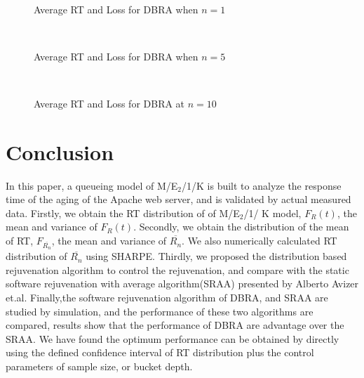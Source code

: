 \documentclass[10pt,journal,letterpaper,compsoc]{IEEEtran}
\begin{document}
\begin{figure}[htb]
\centering
{}
\\
\caption{Average RT and Loss for DBRA  when $n=1$}
\end{figure}

\begin{figure}[htb]
\centering
{}
\\
\caption{Average RT and Loss for DBRA when  $n=5$}
\end{figure}

\begin{figure}[htb]
\centering
{}
\\
\caption{Average RT and Loss for DBRA at $n=10$}
\end{figure}

\section{Conclusion}
\label{sec:conclusion}
In this paper, a queueing model of M/E$_2$/1/K is built to analyze the
response time of the aging of the Apache web server,
and is validated by actual measured data.
Firstly, we obtain the RT distribution of of M/E$_2$/1/ K model,
$F_R(t)$, the mean and variance of $F_R(t)$.
Secondly, we obtain the distribution of the mean of RT,
$F_{\overline{R_n}}$,
the mean and variance of $\overline{R_n}$.
We also numerically calculated RT distribution of $\overline{R_n}$
using SHARPE.
Thirdly, we proposed the distribution based rejuvenation algorithm to
control the rejuvenation, and compare with the static software rejuvenation
with average algorithm(SRAA) presented by Alberto Avizer et.al.
Finally,the software rejuvenation algorithm of DBRA, and SRAA are
studied by simulation, and the performance of these two algorithms are
compared, results show that the performance of DBRA are
advantage over the SRAA.
We have found the optimum performance can be obtained by directly using
the defined confidence interval of RT distribution plus the control parameters of sample size,
or bucket depth.
\end{document}
